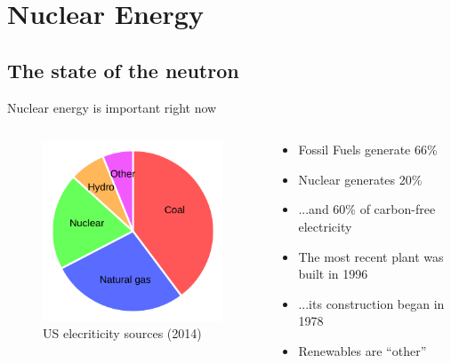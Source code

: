 \documentclass{beamer}
\begin{document}
\section{Nuclear Energy}

\subsection{The state of the neutron}

    \begin{frame}{Nuclear energy is important right now}

        \begin{columns}[T]

            \begin{column}{0.5\textwidth}
                \begin{figure}
                    \centering
                    \includegraphics{./img/sources.pdf}
                    \caption*{US elecriticity sources (2014)}
                \end{figure}
            \end{column}

            \begin{column}{0.5\textwidth}
                \begin{itemize}
                    \item Fossil Fuels generate 66\%
                    \pause
                    \item Nuclear generates 20\%
                    \pause
                    \item ...and 60\% of carbon-free electricity
                    \pause
                    \item The most recent plant was built in 1996
                    \pause
                    \item ...its construction began in 1978
                    \pause
                    \item Renewables are ``other''
                \end{itemize}
            \end{column}

        \end{columns}

    \end{frame}
\end{document}
